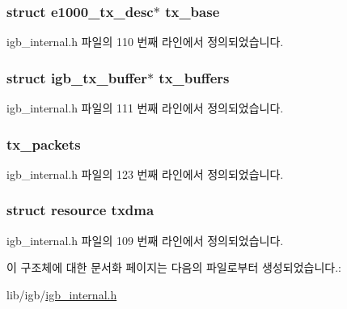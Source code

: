 \subsubsection[{\texorpdfstring{tx\+\_\+base}{tx_base}}]{\setlength{\rightskip}{0pt plus 5cm}struct {\bf e1000\+\_\+tx\+\_\+desc}$\ast$ tx\+\_\+base}\hypertarget{structtx__ring_afcf2ae577a4363723c3403d160dd4d01}{}\label{structtx__ring_afcf2ae577a4363723c3403d160dd4d01}


igb\+\_\+internal.\+h 파일의 110 번째 라인에서 정의되었습니다.

\subsubsection[{\texorpdfstring{tx\+\_\+buffers}{tx_buffers}}]{\setlength{\rightskip}{0pt plus 5cm}struct {\bf igb\+\_\+tx\+\_\+buffer}$\ast$ tx\+\_\+buffers}\hypertarget{structtx__ring_a9b0485752fc6d8befa2f35ebd45710db}{}\label{structtx__ring_a9b0485752fc6d8befa2f35ebd45710db}


igb\+\_\+internal.\+h 파일의 111 번째 라인에서 정의되었습니다.

\subsubsection[{\texorpdfstring{tx\+\_\+packets}{tx_packets}}]{ tx\+\_\+packets}\hypertarget{structtx__ring_aecff768191caa8237ae27ddfac500aaa}{}\label{structtx__ring_aecff768191caa8237ae27ddfac500aaa}


igb\+\_\+internal.\+h 파일의 123 번째 라인에서 정의되었습니다.

\subsubsection[{\texorpdfstring{txdma}{txdma}}]{\setlength{\rightskip}{0pt plus 5cm}struct {\bf resource} txdma}\hypertarget{structtx__ring_aefdccf596fff8b81ada9dd89b75697a8}{}\label{structtx__ring_aefdccf596fff8b81ada9dd89b75697a8}


igb\+\_\+internal.\+h 파일의 109 번째 라인에서 정의되었습니다.



이 구조체에 대한 문서화 페이지는 다음의 파일로부터 생성되었습니다.\+:\begin{DoxyCompactItemize}
\item 
lib/igb/\hyperlink{igb__internal_8h}{igb\+\_\+internal.\+h}\end{DoxyCompactItemize}
